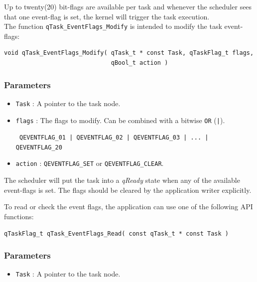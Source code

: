 \documentclass{article}
\begin{document}
Up to twenty(20) bit-flags are available per task and whenever the scheduler sees that one event-flag is set, the kernel will trigger the task execution.
\\
The function \lstinline{qTask_EventFlags_Modify} is intended to modify the task event-flags: \\

\begin{lstlisting}[style=CStyle]
void qTask_EventFlags_Modify( qTask_t * const Task, qTaskFlag_t flags, 
                              qBool_t action )
\end{lstlisting} 

\subsubsection*{Parameters}
\begin{itemize}
    \item \lstinline{Task} : A pointer to the task node.
    \item \lstinline{flags} : The flags to modify. Can be combined with a bitwise \lstinline{OR} (\lstinline{|}).
    
    \lstinline{ QEVENTFLAG_01 | QEVENTFLAG_02 | QEVENTFLAG_03 | ... | QEVENTFLAG_20 }
    \item \lstinline{action} : \lstinline{QEVENTFLAG_SET} or \lstinline{QEVENTFLAG_CLEAR}. 
\end{itemize}
\newline

\begin{tcolorbox}
\HandRight The scheduler will put the task into a \textit{qReady} state when any of the available event-flags is set. The flags should be cleared by the application writer explicitly. 
\end{tcolorbox}
\newline
To read or check the event flags, the application can use one of the following API functions: \\

\begin{lstlisting}[style=CStyle]
qTaskFlag_t qTask_EventFlags_Read( const qTask_t * const Task )
\end{lstlisting} 

\subsubsection*{Parameters}
\begin{itemize}
    \item \lstinline{Task} : A pointer to the task node.
\end{itemize}
\end{document}
